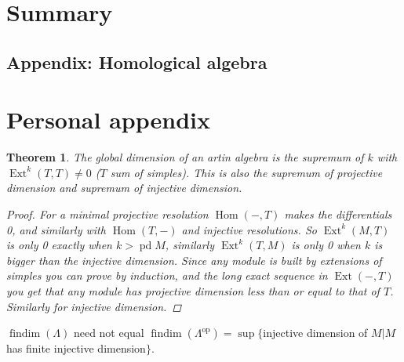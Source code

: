 \documentclass[11pt, a4paper, english]{article}
\newtheorem{theorem}{Theorem}[section]
\theoremstyle{definition}
\DeclareMathOperator{\Hom}{Hom}
\DeclareMathOperator{\Ext}{Ext}
\DeclareMathOperator{\findim}{findim}
\DeclareMathOperator{\pd}{pd}
\begin{document}
\section{Summary}


\begin{appendices}
\section{Appendix: Homological algebra}\label{sec:appendix}

\end{appendices}

\section{Personal appendix}
\begin{theorem}
	The global dimension of an artin algebra is the supremum of $k$ with $\Ext^k(T,T)\neq 0$ ($T$ sum of simples). This is also the supremum of projective dimension and supremum of injective dimension.
	\begin{proof}
		For a minimal projective resolution $\Hom(-,T)$ makes the differentials 0, and similarly with $\Hom(T,-)$ and injective resolutions. So $\Ext^k(M, T)$ is only 0 exactly when $k>\pd M$, similarly $\Ext^k(T,M)$ is only 0 when $k$ is bigger than the injective dimension. Since any module is built by extensions of simples you can prove by induction, and the long exact sequence in $\Ext(-,T)$ you get that any module has projective dimension less than or equal to that of $T$. Similarly for injective dimension.
	\end{proof}
\end{theorem}

$\findim(\Lambda)$ need not equal $\findim(\Lambda^{\operatorname{op}}) = \sup\{ $injective dimension of $M | M$ has finite injective dimension$ \}$.
\end{document}
